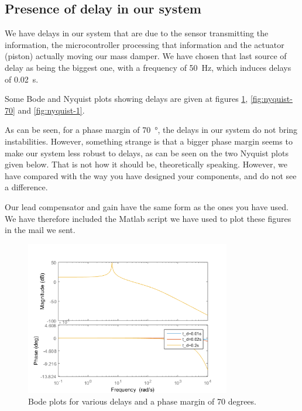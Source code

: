 \subsection{Presence of delay in our system}
We have delays in our system that are due to the sensor transmitting the information, the microcontroller processing that information and the actuator (piston) actually moving our mass damper. We have chosen that last source of delay as being the biggest one, with a frequency of \SI{50}{\hertz}, which induces delays of \SI{0.02}{\second}.\par
Some Bode and Nyquist plots showing delays are given at figures \ref{fig:bode-70}, \ref{fig:nyquist-70} and \ref{fig:nyquist-1}.\par
As can be seen, for a phase margin of \SI{70}{\degree}, the delays in our system do not bring instabilities. However, something strange is that a bigger phase margin seems to make our system less robust to delays, as can be seen on the two Nyquist plots given below. That is not how it should be, theoretically speaking. However, we have compared with the way you have designed your components, and do not see a difference.\par
Our lead compensator and gain have the same \og{}form\fg{} as the ones you have used. We have therefore included the Matlab script we have used to plot these figures in the mail we sent.
\begin{figure}[H]
    \centering
    \includegraphics[width=0.8\textwidth]{resources/png/bode-70.png}
    \caption{Bode plots for various delays and a phase margin of 70 degrees.}
    \label{fig:bode-70}
\end{figure}
